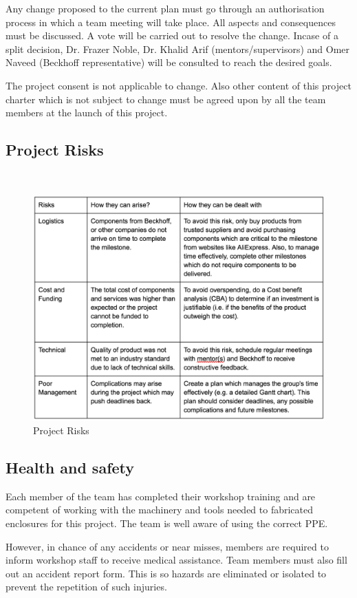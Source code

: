 \documentclass[a4paper, 10pt, conference]{IEEEconf}
\begin{document}
Any change proposed to the current plan must go through an authorisation process in which a team meeting will take place. All aspects and consequences must be discussed. A vote will be carried out to resolve the change. Incase of a split decision, Dr. Frazer Noble, Dr. Khalid Arif (mentors/supervisors) and Omer Naveed (Beckhoff representative) will be consulted to reach the desired goals.

The project consent is not applicable to change. Also other content of this project charter which is not subject to change must be agreed upon by all the team members at the launch of this project. 

\subsection{Project Risks}
\
\begin{figure}[h!]
  \includegraphics[width=\linewidth]{images/Management}
  \caption{Project Risks}
  \label{fig:ProjectRisks}
\end{figure}

\subsection{Health and safety}
Each member of the team has completed their workshop training and are competent of working with the machinery and tools needed to fabricated enclosures for this project. The team is well aware of using the correct PPE.

However, in chance of any accidents or near misses, members are required to inform workshop staff to receive medical assistance. Team members must also fill out an accident report form. This is so hazards are eliminated or isolated to prevent the repetition of such injuries.
\end{document}
